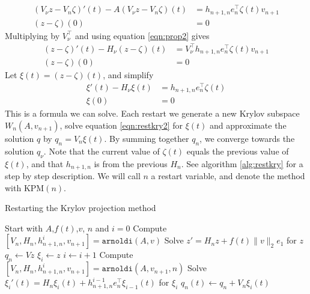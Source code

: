 \begin{equation*}%
\begin{aligned}
 (V_\nu z-V_n \zeta)'(t)-A (V_\nu z-V_n \zeta)(t) &=  h_{n+1,n}e_n^\top \zeta(t) v_{n+1}  \\
(z-\zeta)(0)& = 0
\end{aligned}
\end{equation*}
Multiplying by $V_\nu^{\top}$ and using equation \eqref{eqn:prop2} gives
\begin{equation*}
\begin{aligned}
 (z-\zeta)'(t)-H_\nu (z-\zeta)(t) &= V_\nu^\top h_{n+1,n}e_n^\top \zeta(t) v_{n+1}  \\
(z-\zeta)(0)& = 0
\end{aligned}
\end{equation*}
Let $\xi(t) = (z-\zeta)(t)$, and simplify
\begin{equation}\label{eqn:restkry2}
\begin{aligned}
 \xi '(t) -H_\nu \xi(t) &= h_{n+1,n}e_n^\top \zeta (t)  \\
\xi(0)& = 0
\end{aligned}
\end{equation}
This is a formula we can solve. Each restart we generate a new Krylov subspace $W_n(A,v_{n+1})$, solve equation \eqref{eqn:restkry2} for $\xi(t)$ and approximate the solution $q$ by $ q_n =  V_n\xi(t)$. By summing together $q_n$, we converge towards the solution $q_\nu$. Note that the current value of $\zeta(t)$ equals the previous value of $\xi(t)$, and that $h_{n+1,n}$ is from the previous $H_n$. See algorithm \ref{alg:restkry} for a step by step description. We will call $n$ a restart variable, and denote the method with KPM$(n)$.
\begin{algorithm}
\begin{algorithmic} \caption{Restarting the Krylov projection method} \label{alg:restkry} 
\STATE Start with $A$,$f(t)$,$v$, $n$ and $i = 0$
\STATE Compute $[V_n,H_n,h_{n+1,n}^i,v_{n+1}] = \texttt{arnoldi}(A,v)$
\STATE Solve $  z' = H_n z + f(t) \| v \|_2 e_1  $ for $z$
\STATE $ q_n \leftarrow  V z $
\STATE $\xi_i \leftarrow z$
    \STATE $i \leftarrow i + 1$
    \STATE Compute $[V_n,H_n,h_{n+1,n}^i,v_{n+1}] = \texttt{arnoldi}(A,v_{n+1},n)$
    \STATE Solve $ \xi_i'(t) = H_n \xi_i(t) + h_{n+1,n}^{i-1}e_n^\top \xi_{i-1}(t)  $ for $\xi_i$
    \STATE $ q_n(t) \leftarrow q_n + V_n \xi_i(t) $
\ENDWHILE
\end{algorithmic} 
\end{algorithm}

